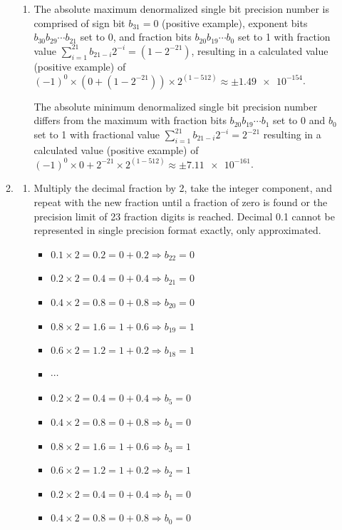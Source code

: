 \documentclass[main.tex]{subfiles}
\begin{document}
\begin{enumerate}
\begin{enumerate}
\begin{enumerate}
        \item The absolute maximum denormalized single bit precision number is comprised of sign bit $b_{31} = 0$ (positive example), exponent bits $b_{30} b_{29} \cdots b_{21}$ set to 0, and fraction bits $b_{20} b_{19} \cdots b_{0}$ set to 1 with fraction value $\sum_{i=1}^{21} b_{21-i} 2^{-i} = (1-2^{-21})$, resulting in a calculated value (positive example) of $(-1)^0 \times (0+(1-2^{-21})) \times 2^{(1-512)} \approx \pm\num{1.49e-154}$. 
        
        The absolute minimum denormalized single bit precision number differs from the maximum with fraction bits $b_{20} b_{19} \cdots b_{1}$ set to 0 and $b_{0}$ set to 1 with fractional value $\sum_{i=1}^{21} b_{21-i} 2^{-i} = 2^{-21}$ resulting in a calculated value (positive example) of $(-1)^0 \times 0+2^{-21} \times 2^{(1-512)} \approx \pm\num{7.11e-161}$.
    \end{enumerate}
    
    \item
    \begin{enumerate}
        \item Multiply the decimal fraction by 2, take the integer component, and repeat with the new fraction until a fraction of zero is found or the precision limit of 23 fraction digits is reached. Decimal 0.1 cannot be represented in single precision format exactly, only approximated.
        
        \medskip
        
        \begin{itemize}[label={}]
            \item $0.1 \times 2 = 0.2 = 0 + 0.2 \Rightarrow b_{22}=0$
            \item $0.2 \times 2 = 0.4 = 0 + 0.4 \Rightarrow b_{21}=0$
            \item $0.4 \times 2 = 0.8 = 0 + 0.8 \Rightarrow b_{20}=0$
            \item $0.8 \times 2 = 1.6 = 1 + 0.6 \Rightarrow b_{19}=1$
            \item $0.6 \times 2 = 1.2 = 1 + 0.2 \Rightarrow b_{18}=1$
            \item $\cdots$
            \item $0.2 \times 2 = 0.4 = 0 + 0.4 \Rightarrow b_{5}=0$
            \item $0.4 \times 2 = 0.8 = 0 + 0.8 \Rightarrow b_{4}=0$
            \item $0.8 \times 2 = 1.6 = 1 + 0.6 \Rightarrow b_{3}=1$
            \item $0.6 \times 2 = 1.2 = 1 + 0.2 \Rightarrow b_{2}=1$
            \item $0.2 \times 2 = 0.4 = 0 + 0.4 \Rightarrow b_{1}=0$
            \item $0.4 \times 2 = 0.8 = 0 + 0.8 \Rightarrow b_{0}=0$
        \end{itemize}
        

\end{enumerate}
\end{enumerate}
\end{enumerate}
\end{document}
